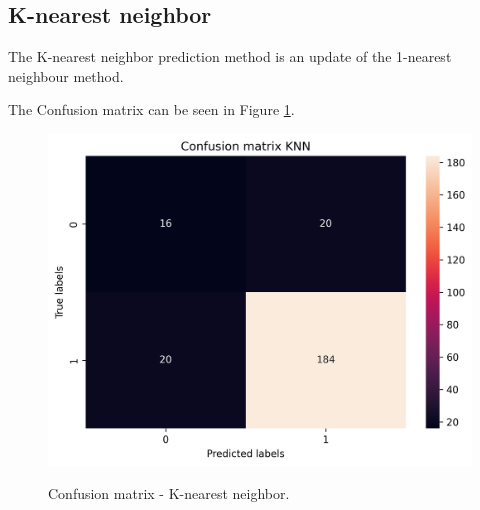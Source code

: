 \documentclass{article}
\begin{document}










\subsection{K-nearest neighbor}

The K-nearest neighbor prediction method is an update of the 1-nearest neighbour method.

The Confusion matrix can be seen in Figure \ref{fig:cmkn}.


\begin{figure}[H]
		\centering
		\caption{Confusion matrix - K-nearest neighbor.}		\includegraphics[width=0.5\linewidth]{Report/Images/confusion_matrix_renan_knn.png}
	\label{fig:cmkn}
	\end{figure}
\end{document}
